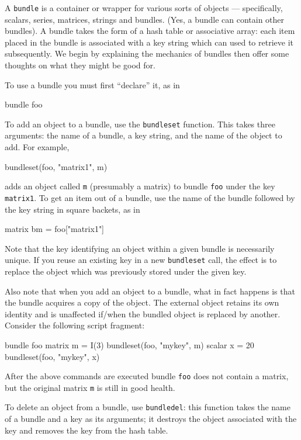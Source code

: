 A \texttt{bundle} is a container or wrapper for various sorts of
objects --- specifically, scalars, series, matrices, strings and
bundles. (Yes, a bundle can contain other bundles). A bundle takes
the form of a hash table or associative array: each item placed in the
bundle is associated with a key string which can used to retrieve it
subsequently. We begin by explaining the mechanics of bundles then
offer some thoughts on what they might be good for.

To use a bundle you must first ``declare'' it, as in

\begin{code}
bundle foo
\end{code}

To add an object to a bundle, use the \texttt{bundleset}
function. This takes three arguments: the name of a bundle, a key
string, and the name of the object to add. For example,

\begin{code}
bundleset(foo, "matrix1", m)
\end{code}

adds an object called \texttt{m} (presumably a matrix) to bundle
\texttt{foo} under the key \texttt{matrix1}. To get an item out
of a bundle, use the name of the bundle followed by the key string in
square backets, as in

\begin{code}
matrix bm = foo["matrix1"]
\end{code}

Note that the key identifying an object within a given bundle is
necessarily unique. If you reuse an existing key in a new
\texttt{bundleset} call, the effect is to replace the object
which was previously stored under the given key.

Also note that when you add an object to a bundle, what in fact
happens is that the bundle acquires a copy of the object. The
external object retains its own identity and is unaffected 
if/when the bundled object is replaced by another. Consider
the following script fragment:

\begin{code}
bundle foo
matrix m = I(3)
bundleset(foo, "mykey", m)
scalar x = 20
bundleset(foo, "mykey", x)
\end{code}

After the above commands are executed bundle \texttt{foo} does not
contain a matrix, but the original matrix \texttt{m} is still in good
health.

To delete an object from a bundle, use \texttt{bundledel}: this
function takes the name of a bundle and a key as its arguments;
it destroys the object associated with the key and removes the
key from the hash table.

